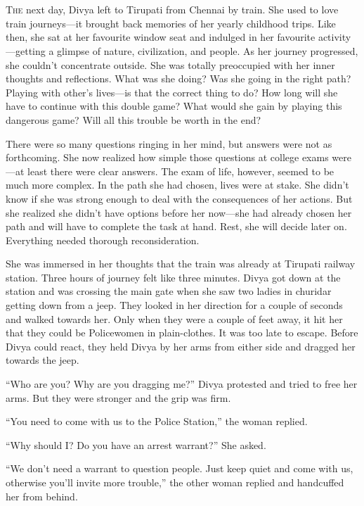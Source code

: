 \chapter{}

\lettrine{T}{he} next day, Divya left to Tirupati from Chennai by train. She used to love
train journeys—it brought back memories of her yearly childhood trips. Like
then, she sat at her favourite window seat and indulged in her favourite
activity—getting a glimpse of nature, civilization, and people. As her journey
progressed, she couldn't concentrate outside. She was totally preoccupied with
her inner thoughts and reflections. What was she doing? Was she going in the
right path? Playing with other's lives—is that the correct thing to do? How
long will she have to continue with this double game? What would she gain by
playing this dangerous game? Will all this trouble be worth in the end?

There were so many questions ringing in her mind, but answers were not as
forthcoming. She now realized how simple those questions at college exams
were—at least there were clear answers. The exam of life, however, seemed to be
much more complex. In the path she had chosen, lives were at stake. She didn't know
if she was strong enough to deal with the consequences of her actions. But she
realized she didn't have options before her now—she had already chosen her
path and will have to complete the task at hand. Rest, she will decide later on.
Everything needed thorough reconsideration.

She was immersed in her thoughts that the train was already at Tirupati railway
station. Three hours of journey felt like three minutes. Divya got down at the
station and was crossing the main gate when she saw two ladies in churidar
getting down from a jeep. They looked in her direction for a couple of seconds
and walked towards her. Only when they were a couple of feet away, it hit her
that they could be Policewomen in plain-clothes. It was too late to escape.
Before Divya could react, they held Divya by her arms from either side and
dragged her towards the jeep.

“Who are you? Why are you dragging me?” Divya protested and tried to free her
arms. But they were stronger and the grip was firm.

“You need to come with us to the Police Station,” the woman replied.

“Why should I? Do you have an arrest warrant?” She asked.

“We don't need a warrant to question people. Just keep quiet and come with us,
otherwise you'll invite more trouble,” the other woman replied and handcuffed
her from behind.

